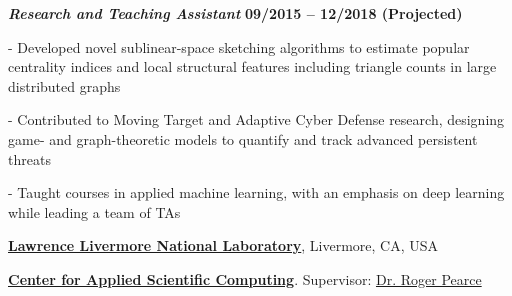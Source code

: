 \documentclass[10pt]{article}
\newcommand{\halfblankline}{\quad\vspace{-0.5\baselineskip}\pagebreak[3]}
\begin{document}
\vspace{-0.5em}

\begin{outerlist}

\item[] \textbf{\textit{Research and Teaching Assistant}}%
\hfill \textbf{09/2015 -- 12/2018 (Projected)}

\begin{innerlist}

\item[-] Developed novel sublinear-space sketching algorithms to estimate popular centrality indices and local structural features including triangle counts in large distributed graphs 

\item[-] Contributed to Moving Target and Adaptive Cyber Defense research, designing game- and graph-theoretic models to quantify and track advanced persistent threats

\item[-] Taught courses in applied machine learning, with an emphasis on deep learning while leading a team of TAs

\end{innerlist}
\end{outerlist}






\halfblankline



\href{https://www.llnl.gov/}{\textbf{Lawrence Livermore National Laboratory}},
Livermore, CA, USA

\href{https://computation.llnl.gov/casc/}{\textbf{Center for Applied Scientific Computing}}.
Supervisor:               
\href{https://people.llnl.gov/pearce7}
{Dr. Roger Pearce}
\end{document}
